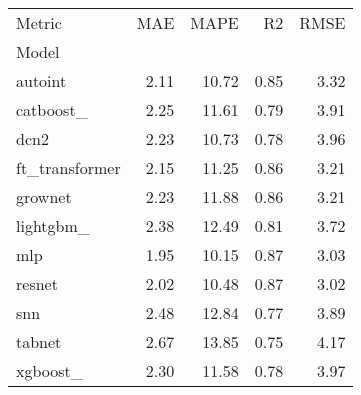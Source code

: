 \begin{tabular}{lrrrr}
\toprule
Metric &  MAE &  MAPE &   R2 &  RMSE \\
Model          &      &       &      &       \\
\midrule
autoint        & 2.11 & 10.72 & 0.85 &  3.32 \\
catboost\_      & 2.25 & 11.61 & 0.79 &  3.91 \\
dcn2           & 2.23 & 10.73 & 0.78 &  3.96 \\
ft\_transformer & 2.15 & 11.25 & 0.86 &  3.21 \\
grownet        & 2.23 & 11.88 & 0.86 &  3.21 \\
lightgbm\_      & 2.38 & 12.49 & 0.81 &  3.72 \\
mlp            & 1.95 & 10.15 & 0.87 &  3.03 \\
resnet         & 2.02 & 10.48 & 0.87 &  3.02 \\
snn            & 2.48 & 12.84 & 0.77 &  3.89 \\
tabnet         & 2.67 & 13.85 & 0.75 &  4.17 \\
xgboost\_       & 2.30 & 11.58 & 0.78 &  3.97 \\
\bottomrule
\end{tabular}
